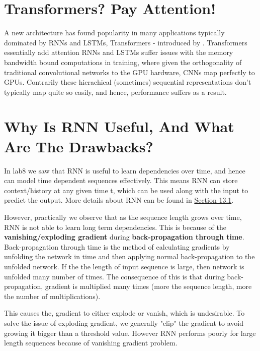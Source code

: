 \section{ Transformers? Pay Attention! }
A new architecture has found popularity in many applications typically dominated by RNNs and LSTMs, Transformers - introduced by \cite{DBLP:journals/corr/VaswaniSPUJGKP17}. Transformers essentially add attention 
RNNs and LSTMs suffer issues with the memory bandwidth bound computations in training, where given the orthogonality of traditional convolutional networks to the GPU hardware, CNNs map perfectly to GPUs. Contrarily these hierachical (sometimes) sequential representations don't typically map quite so easily, and hence, performance suffers as a result.\\



\section{Why Is RNN Useful, And What Are The Drawbacks?}

In lab8 we saw that RNN is useful to learn dependencies over time, and hence can model time dependent sequences effectively.
This means RNN can store context/history at any given time t, which can be used along with the input to predict the output. 
More details about RNN can be found in \hyperref[sec:SimpleRecNet]{Section 13.1}.


However, practically we observe that as the sequence length grows over time, RNN is not able to learn long term dependencies.
This is because of the \textbf{vanishing/exploding gradient} during \textbf{back-propagation through time}.
Back-propagation through time is the method of calculating gradients by unfolding the network in time and then applying normal back-propagation to the unfolded network.
If the the length of input sequence is large, then network is unfolded many number of times.
The consequence of this is that during back-propagation, gradient is multiplied many times (more the sequence length, more the number of multiplications). 


This causes the, gradient to either explode or vanish, which is undesirable.
To solve the issue of exploding gradient, we generally "clip" the gradient to avoid growing it bigger than a threshold value.
However RNN performs poorly for large length sequences because of vanishing gradient problem.

